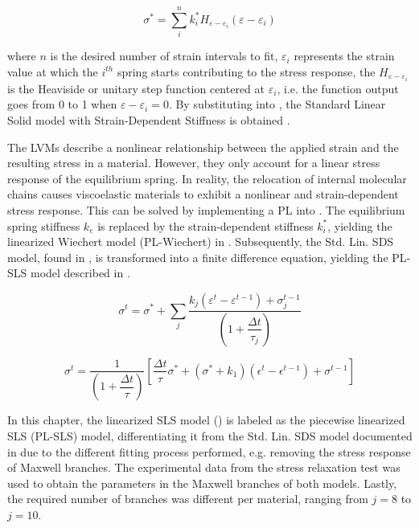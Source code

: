 \begin{equation}
\label{eq5}
\sigma^* = \sum_i^n k_i^* H_{\varepsilon - \varepsilon_i}(\varepsilon - \varepsilon_i)
\end{equation}

\noindent where $n$ is the desired number of strain intervals to fit, $\varepsilon_i$ represents the strain value at which the $i^{th}$ spring starts contributing to the stress response, the $H_{\varepsilon - \varepsilon_i}$ is the Heaviside or unitary step function centered at $\varepsilon_i$, i.e. the function output goes from 0 to 1 when $\varepsilon - \varepsilon_i = 0$. By substituting  into , the Standard Linear Solid model with Strain-Dependent Stiffness is obtained \cite{austin2015control}.

The LVMs describe a nonlinear relationship between the applied strain and the resulting stress in a material. However, they only account for a linear stress response of the equilibrium spring. In reality, the relocation of internal molecular chains causes viscoelastic materials to exhibit a nonlinear and strain-dependent stress response. This can be solved by implementing a PL into . The equilibrium spring stiffness $k_e$ is replaced by the strain-dependent stiffness $k_i^*$, yielding the linearized Wiechert model (PL-Wiechert) in . Subsequently, the Std. Lin. SDS model, found in \cite{austin2015control}, is transformed into a finite difference equation, yielding the PL-SLS model described in .

\begin{equation}
\label{eq6}
\sigma^t = \sigma^* + \sum_j \frac{k_j (\varepsilon^t-\varepsilon^{t-1}) + \sigma_j^{t-1}}{\left( 1 + \dfrac{\Delta t}{\tau_j}\right) }
\end{equation}

\begin{equation}
\label{eq7}
\sigma^ t = \frac{1}{\left( 1+\dfrac{\Delta t} {\tau} \right) } \left[  \frac{\Delta t}{\tau} \sigma^* + (\sigma^* + k_1) (\epsilon^t-\epsilon^{t-1}) + \sigma^{t-1} \right]  
\end{equation}

In this chapter, the linearized SLS model () is labeled as the piecewise linearized SLS (PL-SLS) model, differentiating it from the Std. Lin. SDS model documented in \cite{austin2015control} due to the different fitting process performed, e.g. removing the stress response of Maxwell branches. The experimental data from the stress relaxation test was used to obtain the parameters in the Maxwell branches of both models. Lastly, the required number of branches was different per material, ranging from $j=8$ to $j=10$.

